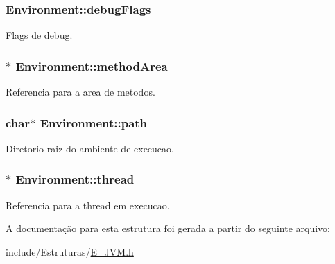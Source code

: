 \subsubsection[{debug\+Flags}]{ Environment\+::debug\+Flags}\label{struct_environment_a8c0e2258ed60e94b0c7a66eac8e27e64}


Flags de debug. 

\hypertarget{struct_environment_a1c73c41c6c38e7e67ea22f6d59044852}{}
\subsubsection[{method\+Area}]{$\ast$ Environment\+::method\+Area}\label{struct_environment_a1c73c41c6c38e7e67ea22f6d59044852}


Referencia para a area de metodos. 

\hypertarget{struct_environment_accb313aa6b20e1c01b21021e734ec7ea}{}
\subsubsection[{path}]{\setlength{\rightskip}{0pt plus 5cm}char$\ast$ Environment\+::path}\label{struct_environment_accb313aa6b20e1c01b21021e734ec7ea}


Diretorio raiz do ambiente de execucao. 

\hypertarget{struct_environment_a9521ae1091a45875768bdbbe0a339014}{}
\subsubsection[{thread}]{$\ast$ Environment\+::thread}\label{struct_environment_a9521ae1091a45875768bdbbe0a339014}


Referencia para a thread em execucao. 



A documentação para esta estrutura foi gerada a partir do seguinte arquivo\+:\begin{DoxyCompactItemize}
\item 
include/\+Estruturas/\hyperlink{_e___j_v_m_8h}{E\+\_\+\+J\+V\+M.\+h}\end{DoxyCompactItemize}
